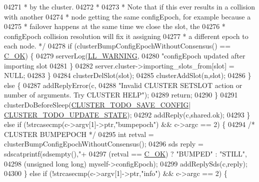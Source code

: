 \begin{DoxyCode}
{{{{{{{{{{{{{{{{{{{{{{{{{{{{{{{{{{{{{{{{{{{{{{{{{{{{{{{{{{{{{{{{{{{{{{{{{{{{{{{{{{{04271 \textcolor{comment}{                 * by the cluster.}
04272 \textcolor{comment}{                 *}
04273 \textcolor{comment}{                 * Note that if this ever results in a collision with another}
04274 \textcolor{comment}{                 * node getting the same configEpoch, for example because a}
04275 \textcolor{comment}{                 * failover happens at the same time we close the slot, the}
04276 \textcolor{comment}{                 * configEpoch collision resolution will fix it assigning}
04277 \textcolor{comment}{                 * a different epoch to each node. */}
04278                 \textcolor{keywordflow}{if} (clusterBumpConfigEpochWithoutConsensus() == \hyperlink{server_8h_a303769ef1065076e68731584e758d3e1}{C\_OK}) \{
04279                     serverLog(\hyperlink{server_8h_a31229b9334bba7d6be2a72970967a14b}{LL\_WARNING},
04280                         \textcolor{stringliteral}{"configEpoch updated after importing slot %
04281                 \}
04282                 server.cluster->importing\_slots\_from[slot] = NULL;
04283             \}
04284             clusterDelSlot(slot);
04285             clusterAddSlot(n,slot);
04286         \} \textcolor{keywordflow}{else} \{
04287             addReplyError(c,
04288                 \textcolor{stringliteral}{"Invalid CLUSTER SETSLOT action or number of arguments. Try CLUSTER HELP"});
04289             \textcolor{keywordflow}{return};
04290         \}
04291         clusterDoBeforeSleep(\hyperlink{cluster_8h_a0ae5ff08fbae3c655012b4de8bfc327d}{CLUSTER\_TODO\_SAVE\_CONFIG}|
      \hyperlink{cluster_8h_abea0d393cba342261e4a7e6fb745f388}{CLUSTER\_TODO\_UPDATE\_STATE});
04292         addReply(c,shared.ok);
04293     \} \textcolor{keywordflow}{else} \textcolor{keywordflow}{if} (!strcasecmp(c->argv[1]->ptr,\textcolor{stringliteral}{"bumpepoch"}) && c->argc == 2) \{
04294         \textcolor{comment}{/* CLUSTER BUMPEPOCH */}
04295         \textcolor{keywordtype}{int} retval = clusterBumpConfigEpochWithoutConsensus();
04296         sds reply = sdscatprintf(sdsempty(),\textcolor{stringliteral}{"+%
04297                 (retval == \hyperlink{server_8h_a303769ef1065076e68731584e758d3e1}{C\_OK}) ? \textcolor{stringliteral}{"BUMPED"} : \textcolor{stringliteral}{"STILL"},
04298                 (\textcolor{keywordtype}{unsigned} \textcolor{keywordtype}{long} \textcolor{keywordtype}{long}) myself->configEpoch);
04299         addReplySds(c,reply);
04300     \} \textcolor{keywordflow}{else} \textcolor{keywordflow}{if} (!strcasecmp(c->argv[1]->ptr,\textcolor{stringliteral}{"info"}) && c->argc == 2) \{
}}}}}}}}}}}}}}}}}}}}}}}}}}}}}}}}}}}}}}}}}}}}}}}}}}}}}}}}}}}}}}}}}}}}}}}}}}}}}}}}}}}}}
\end{DoxyCode}
